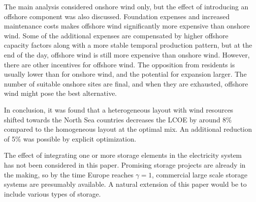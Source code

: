 \documentclass[a4paper, 5p, sort&compress]{elsarticle}%
\begin{document}
{%

The main analysis considered onshore wind only, but the effect of
introducing an offshore component was also discussed. Foundation
expenses and increased maintenance costs makes offshore wind
significantly more expensive than onshore wind. Some of the additional
expenses are compensated by higher offshore capacity factors along
with a more stable temporal production pattern, but at the end of the
day, offshore wind is still more expensive than onshore wind. However,
there are other incentives for offshore wind. The opposition from
residents is usually lower than for onshore wind, and the potential
for expansion larger. The number of suitable onshore sites are final,
and when they are exhausted, offshore wind might pose the best
alternative. 

In conclusion, it was found that a heterogeneous layout with wind
resources shifted towards the North Sea countries decreases the LCOE
by around 8\% compared to the homogeneous layout at the optimal
mix. An additional reduction of 5\% was possible by explicit
optimization. \newline

The effect of integrating one or more storage elements in the
electricity system has not been considered in this paper. Promising
storage projects are already in the making, so by the time Europe reaches
$\gamma = 1$, commercial large scale storage systems are presumably
available. A natural extension of this paper would be to include
various types of storage.



}
\end{document}
